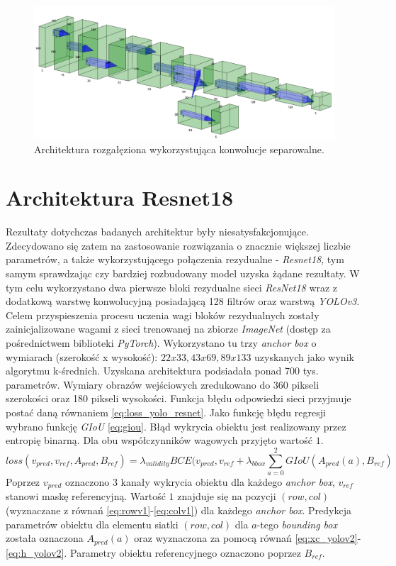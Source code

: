 \begin{figure}
    \centering
    \includegraphics[width=\linewidth]{images/Architektura_branched.png}
    \caption{Architektura rozgałęziona wykorzystująca konwolucje separowalne.}
    \label{fig:arch_v2}
\end{figure}


\section{Architektura Resnet18}

Rezultaty dotychczas badanych architektur były niesatysfakcjonujące.
Zdecydowano się zatem na zastosowanie rozwiązania o znacznie większej liczbie parametrów, a także wykorzystującego połączenia rezydualne - \emph{Resnet18}\cite{resnet18}, tym samym sprawdzając czy bardziej rozbudowany model uzyska żądane rezultaty. 
W tym celu wykorzystano dwa pierwsze bloki rezydualne sieci \emph{ResNet18} wraz z dodatkową warstwę konwolucyjną posiadającą 128 filtrów oraz warstwą \emph{YOLOv3}. 
Celem przyspieszenia procesu uczenia wagi bloków rezydualnych zostały zainicjalizowane wagami z sieci trenowanej na zbiorze \emph{ImageNet}\cite{imagenet} (dostęp za pośrednictwem biblioteki \emph{PyTorch}).
Wykorzystano tu trzy \emph{anchor box} o wymiarach (szerokość x wysokość): $22x33, 43x69, 89x133$ uzyskanych jako wynik algorytmu k-średnich. 
Uzyskana architektura podsiadała ponad 700 tys. parametrów.
Wymiary obrazów wejściowych zredukowano do 360 pikseli szerokości oraz 180 pikseli wysokości.
Funkcja błędu odpowiedzi sieci przyjmuje postać daną równaniem \eqref{eq:loss_yolo_resnet}.
Jako funkcję błędu regresji wybrano funkcję \emph{GIoU} \eqref{eq:giou}.
Błąd wykrycia obiektu jest realizowany przez entropię binarną.
Dla obu współczynników wagowych przyjęto wartość $1$.
\begin{equation}
loss(v_{pred},v_{ref},A_{pred}, B_{ref}) = \lambda_{validity} BCE(v_{pred}, v_{ref} + \lambda_{bbox} \sum_{a = 0}^{2} GIoU(A_{pred}(a), B_{ref})
\label{eq:loss_yolo_resnet}
\end{equation}
Poprzez $v_{pred}$ oznaczono 3 kanały wykrycia obiektu dla każdego \emph{anchor box}, 
$v_{ref}$ stanowi maskę referencyjną.
Wartość $1$ znajduje się na pozycji $(row,col)$ (wyznaczane z równań \eqref{eq:rowv1}-\eqref{eq:colv1}) dla każdego \emph{anchor box}.
Predykcja parametrów obiektu dla elementu siatki $(row,col)$ dla $a$-tego \emph{bounding box} została oznaczona $A_{pred}(a)$ oraz wyznaczona za pomocą równań \eqref{eq:xc_yolov2}-\eqref{eq:h_yolov2}.
Parametry obiektu referencyjnego oznaczono poprzez $B_{ref}$. 


